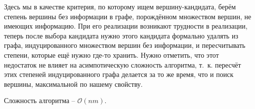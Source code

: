 Здесь мы в качестве критерия, по которому ищем вершину-кандидата, берём степень вершины без информации в графе, порождённом множеством вершин, не имеющих информацию. При его реализации возникают трудности в реализации, теперь после выбора кандидата нужно этого кандидата формально удалять из графа, индуцированного множеством вершин без информации, и пересчитывать степени, которые ещё нужно где-то хранить. Нужно отметить, что этот недостаток не влияет на асимпотическую сложность алгоритма, т. к. пересчёт этих степеней индуцированного графа делается за то же время, что и поиск вершины, максимальной по нашему свойству. 

Сложность алгоритма -- $\mathcal{O}(nm)$.
